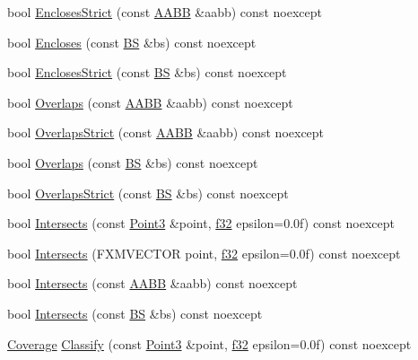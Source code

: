 \begin{DoxyCompactItemize}
\item 
bool \hyperlink{structmage_1_1_view_frustum_a7a0d293c4f3d1f29c54f45f00a7ca51f}{Encloses\+Strict} (const \hyperlink{structmage_1_1_a_a_b_b}{A\+A\+BB} \&aabb) const noexcept
\item 
bool \hyperlink{structmage_1_1_view_frustum_a779328d61928c60bfc0290d85eb79e4c}{Encloses} (const \hyperlink{structmage_1_1_b_s}{BS} \&bs) const noexcept
\item 
bool \hyperlink{structmage_1_1_view_frustum_a4300cf7690bc650ca521283496394997}{Encloses\+Strict} (const \hyperlink{structmage_1_1_b_s}{BS} \&bs) const noexcept
\item 
bool \hyperlink{structmage_1_1_view_frustum_a35c0afb66692cfd26a0e9bee2065892e}{Overlaps} (const \hyperlink{structmage_1_1_a_a_b_b}{A\+A\+BB} \&aabb) const noexcept
\item 
bool \hyperlink{structmage_1_1_view_frustum_a2eef224e458509eada25ec91a53753c6}{Overlaps\+Strict} (const \hyperlink{structmage_1_1_a_a_b_b}{A\+A\+BB} \&aabb) const noexcept
\item 
bool \hyperlink{structmage_1_1_view_frustum_ad7b492eaad1a93e650a8477045d5c0cb}{Overlaps} (const \hyperlink{structmage_1_1_b_s}{BS} \&bs) const noexcept
\item 
bool \hyperlink{structmage_1_1_view_frustum_a05963d6685c8cafc22be50c8e9b405df}{Overlaps\+Strict} (const \hyperlink{structmage_1_1_b_s}{BS} \&bs) const noexcept
\item 
bool \hyperlink{structmage_1_1_view_frustum_ae6e3af2995bbf368e4d0902e3acfd695}{Intersects} (const \hyperlink{structmage_1_1_point3}{Point3} \&point, \hyperlink{namespacemage_a6a44ad388483959dc4dff9f2aef91431}{f32} epsilon=0.\+0f) const noexcept
\item 
bool \hyperlink{structmage_1_1_view_frustum_ad3eec0c2f46cf99358e4ea43a6f68176}{Intersects} (F\+X\+M\+V\+E\+C\+T\+OR point, \hyperlink{namespacemage_a6a44ad388483959dc4dff9f2aef91431}{f32} epsilon=0.\+0f) const noexcept
\item 
bool \hyperlink{structmage_1_1_view_frustum_a222e185f69a78f3c363423618f0a506d}{Intersects} (const \hyperlink{structmage_1_1_a_a_b_b}{A\+A\+BB} \&aabb) const noexcept
\item 
bool \hyperlink{structmage_1_1_view_frustum_a2925f619827d284c86ea5a68e694a8a8}{Intersects} (const \hyperlink{structmage_1_1_b_s}{BS} \&bs) const noexcept
\item 
\hyperlink{namespacemage_aa9fe157e5a578a103160266df8cccb0a}{Coverage} \hyperlink{structmage_1_1_view_frustum_a85e067c36a73b4476bb2fa1217d0c48e}{Classify} (const \hyperlink{structmage_1_1_point3}{Point3} \&point, \hyperlink{namespacemage_a6a44ad388483959dc4dff9f2aef91431}{f32} epsilon=0.\+0f) const noexcept

\end{DoxyCompactItemize}
